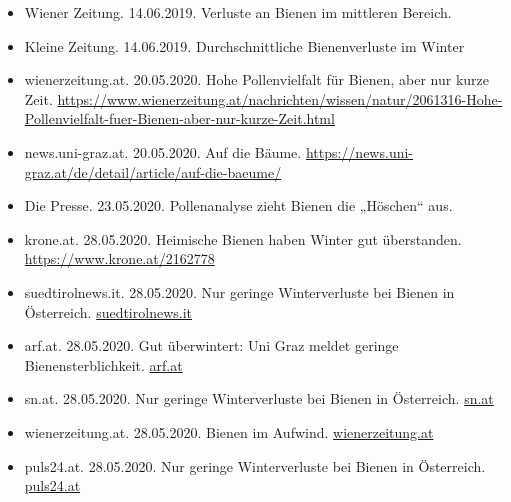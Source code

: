 \begin{itemize}
    \item
    Wiener Zeitung. 14.06.2019. Verluste an Bienen im mittleren Bereich.

    \item
    Kleine Zeitung. 14.06.2019. Durchschnittliche Bienenverluste im Winter
    
    \item
    wienerzeitung.at. 20.05.2020. Hohe Pollenvielfalt für Bienen, aber nur kurze Zeit. \url{https://www.wienerzeitung.at/nachrichten/wissen/natur/2061316-Hohe-Pollenvielfalt-fuer-Bienen-aber-nur-kurze-Zeit.html}
    
    \item
    news.uni-graz.at. 20.05.2020. Auf die Bäume. 
    \url{https://news.uni-graz.at/de/detail/article/auf-die-baeume/}
    
    \item
    Die Presse. 23.05.2020. Pollenanalyse zieht Bienen die „Höschen“ aus.
    
    \item
    krone.at. 28.05.2020. Heimische Bienen haben Winter gut überstanden. 
    \url{https://www.krone.at/2162778}
    
    \item
    suedtirolnews.it. 28.05.2020. Nur geringe Winterverluste bei Bienen in Österreich. \href{https://www.suedtirolnews.it/wirtschaft/nur-geringe-winterverluste-bei-bienen-in-oesterreich}{suedtirolnews.it}
    
    \item
    arf.at. 28.05.2020. Gut überwintert: Uni Graz meldet geringe Bienensterblichkeit. \href{https://www.arf.at/2020/05/28/gut-ueberwintert-uni-graz-meldet-geringe-bienensterblichkeit/}{arf.at}
    
    \item
    sn.at. 28.05.2020. Nur geringe Winterverluste bei Bienen in Österreich. \href{https://www.sn.at/panorama/oesterreich/nur-geringe-winterverluste-bei-bienen-in-oesterreich-88150126}{sn.at}
    
    \item
    wienerzeitung.at. 28.05.2020. Bienen im Aufwind. \href{https://www.wienerzeitung.at/nachrichten/wissen/natur/2062201-Bienen-im-Aufwind.html}{wienerzeitung.at}
    
    \item
    puls24.at. 28.05.2020. Nur geringe Winterverluste bei Bienen in Österreich. \href{https://www.puls24.at/news/chronik/nur-geringe-winterverluste-bei-bienen-in-oesterreich/205520}{puls24.at}
    

\end{itemize}
